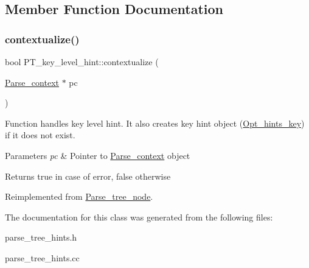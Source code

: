\subsection{Member Function Documentation}
\mbox{\label{classPT__key__level__hint_a3cd3bb9624cf499e03d6a312db574fcf}} 
\subsubsection{\texorpdfstring{contextualize()}{contextualize()}}
{\footnotesize\ttfamily bool P\+T\+\_\+key\+\_\+level\+\_\+hint\+::contextualize (\begin{DoxyParamCaption}\item[{\mbox{\hyperlink{structParse__context}{Parse\+\_\+context}} $\ast$}]{pc }\end{DoxyParamCaption})\hspace{0.3cm}{\ttfamily [virtual]}}

Function handles key level hint. It also creates key hint object (\mbox{\hyperlink{classOpt__hints__key}{Opt\+\_\+hints\+\_\+key}}) if it does not exist.


\begin{DoxyParams}{Parameters}
{\em pc} & Pointer to \mbox{\hyperlink{structParse__context}{Parse\+\_\+context}} object\\
\hline
\end{DoxyParams}
\begin{DoxyReturn}{Returns}
true in case of error, false otherwise 
\end{DoxyReturn}


Reimplemented from \mbox{\hyperlink{classParse__tree__node_a22d93524a537d0df652d7efa144f23da}{Parse\+\_\+tree\+\_\+node}}.



The documentation for this class was generated from the following files\+:\begin{DoxyCompactItemize}
\item 
parse\+\_\+tree\+\_\+hints.\+h\item 
parse\+\_\+tree\+\_\+hints.\+cc\end{DoxyCompactItemize}
